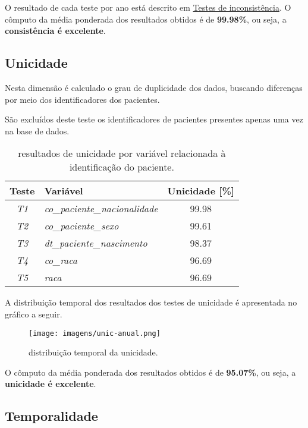 \documentclass[
  12,
  table]{proadi}
\begin{document}
O resultado de cada teste por ano está descrito em
\protect\hyperlink{testes-de-inconsistuxeancia}{Testes de
inconsistência}. O cômputo da média ponderada dos resultados obtidos é
de \textbf{99.98\%}, ou seja, a \textbf{consistência é excelente}.

\hypertarget{unicidade}{%
\subsection{Unicidade}\label{unicidade}}

\label{sub:unicidade}

Nesta dimensão é calculado o grau de duplicidade dos dados, buscando
diferenças por meio dos identificadores dos pacientes.

São excluídos deste teste os identificadores de pacientes presentes
apenas uma vez na base de dados.

\begin{table}[H]

\caption{\label{tab:unnamed-chunk-19}resultados de unicidade por variável relacionada à identificação do paciente.}
\centering
\fontsize{10}{12}\selectfont
\begin{tabular}[t]{>{}c>{}lc}
\toprule
Teste & Variável & Unicidade [\%]\\
\midrule
\em{T1} & \em{co\_paciente\_nacionalidade} & 99.98\\
\em{T2} & \em{co\_paciente\_sexo} & 99.61\\
\em{T3} & \em{dt\_paciente\_nascimento} & 98.37\\
\em{T4} & \em{co\_raca} & 96.69\\
\em{T5} & \em{raca} & 96.69\\
\bottomrule
\end{tabular}
\end{table}

A distribuição temporal dos resultados dos testes de unicidade é
apresentada no gráfico a seguir.

\begin{figure}
\centering
\texttt{[image: imagens/unic-anual.png]}
\caption{distribuição temporal da unicidade.}
\end{figure}

O cômputo da média ponderada dos resultados obtidos é de
\textbf{95.07\%}, ou seja, a \textbf{unicidade é excelente}.

\hypertarget{temporalidade}{%
\subsection{Temporalidade}\label{temporalidade}}
\end{document}
